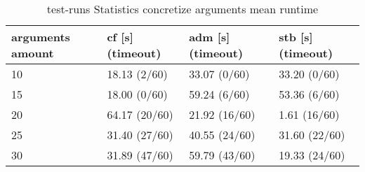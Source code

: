 \begin{table}[H]
    \centering
    \caption{test-runs Statistics concretize arguments mean runtime}
    \begin{tabular}{ |l|l|l|l| }
        \hline
            arguments amount & cf [s] (timeout)& adm [s] (timeout)& stb [s] (timeout)\\
        \hline
            10 & 18.13 \hfill (2/60)  &  33.07 \hfill (0/60)  &  33.20 \hfill (0/60) \\
            15 & 18.00 \hfill (0/60)  &  59.24 \hfill (6/60)  &  53.36 \hfill (6/60) \\
            20 & 64.17 \hfill (20/60) &  21.92 \hfill (16/60) &   1.61 \hfill (16/60) \\
            25 & 31.40 \hfill (27/60) &  40.55 \hfill (24/60) &  31.60 \hfill (22/60) \\
            30 & 31.89 \hfill (47/60) &  59.79 \hfill (43/60) &  19.33 \hfill (24/60) \\
        \hline
    \end{tabular}
\label{table:ExperimentStatisticsConcretize}
\end{table}


